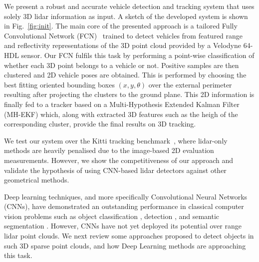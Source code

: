 \documentclass[letterpaper, 10 pt, conference]{ieeeconf}  %
\begin{document}
We present a robust and accurate vehicle detection and tracking system that uses solely 3D lidar information as input. A sketch of the developed system is shown in Fig.~\ref{fig:init}.
The main core of the presented approach is a tailored Fully Convolutional Network (FCN)~\cite{long2015fully} trained to detect vehicles from featured range and reflectivity representations of the 3D point cloud provided by a Velodyne 64-HDL sensor. 
Our FCN fulfils this task by performing a point-wise classification of whether each 3D point belongs to a vehicle or not. 
%
Positive samples are then clustered and 2D vehicle poses are obtained. This is performed by choosing the best fitting oriented bounding boxes $(x,y,\theta)$ over the external perimeter resulting after projecting the clusters to the ground plane.
This 2D information is finally fed to a tracker based on a Multi-Hypothesis Extended Kalman Filter (MH-EKF) which, along with extracted 3D features such as the heigh of the corresponding cluster, provide the final results on 3D tracking. 

We test our system over the Kitti tracking benchmark~\cite{Geiger2012CVPR}, where lidar-only methods are heavily penalised due to the image-based 2D evaluation measurements. However, we show the competitiveness of our approach and validate the hypothesis of using CNN-based lidar detectors against other geometrical methods. 

Deep learning techniques, and more specifically Convolutional Neural Networks (CNNs), have demonstrated an outstanding performance in classical computer vision problems such as object classification \cite{krizhevsky2012imagenet, he2016residual}, detection \cite{ren2015faster, sermanet2014overfeat}, and semantic segmentation \cite{long2015fully}. However, CNNs have not yet deployed its potential over range lidar point clouds. 
We next review some approaches proposed to detect objects in such 3D sparse point clouds, and how Deep Learning methods are approaching this task. 
 
\end{document}
